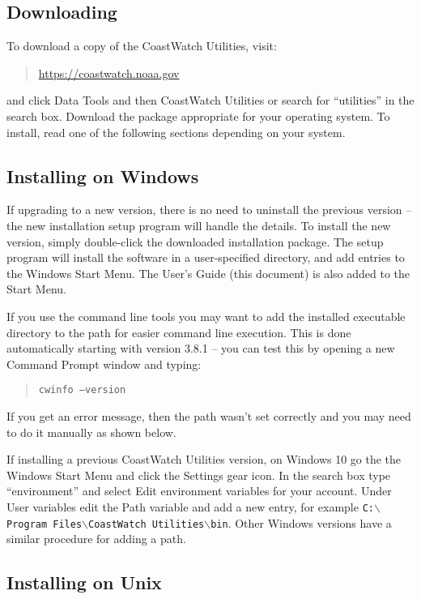 \subsection{Downloading}

To download a copy of the CoastWatch Utilities, visit:
\begin{quote}
  \url{https://coastwatch.noaa.gov}
\end{quote}
and click {\gui Data Tools} and then {\gui CoastWatch Utilities} or 
search for ``utilities'' in the search box.  Download the package 
appropriate for your operating system. To install, read one of the following sections
depending on your system.

\subsection{Installing on Windows}

If upgrading to a new version, there is no need to uninstall the
previous version -- the new installation setup program will handle
the details.  To install the new version, simply double-click the
downloaded installation package. The setup program will install the
software in a user-specified directory, and add entries to the Windows {\gui Start
Menu}.  The User's Guide (this document) is also added to the {\gui Start
Menu}.

If you use the command line tools you may want to add the installed
executable directory to the path for easier command line execution.  This is
done automatically starting with version 3.8.1 -- you can test this by opening
a new {\gui Command Prompt} window and typing:
\begin{quote}
  {\tt cwinfo --version}
\end{quote}
If you get an error message, then the path wasn't set correctly and you may
need to do it manually as shown below.

If installing a previous CoastWatch Utilities version, on Windows 10 go the 
the Windows {\gui Start Menu} and click the
{\gui Settings} gear icon.  In the search box type ``environment'' and select
{\gui Edit environment variables for your account}.  Under {\gui User variables}
edit the {\gui Path} variable and add a new entry, for example
{\tt C:$\backslash$Program Files$\backslash$CoastWatch Utilities$\backslash$bin}.
Other Windows versions have a similar procedure for adding a path.

\subsection{Installing on Unix}

